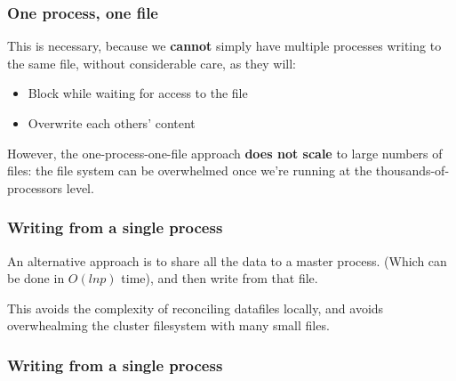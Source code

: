\begin{Shaded}
\begin{Highlighting}[]

     
\end{Highlighting}
\end{Shaded}

\begin{Shaded}
\begin{Highlighting}[]

     \NormalTok{)}
\end{Highlighting}
\end{Shaded}

\subsubsection{One process, one file}\label{one-process-one-file-1}

This is necessary, because we \textbf{cannot} simply have multiple
processes writing to the same file, without considerable care, as they
will:

\begin{itemize}
\itemsep1pt\parskip0pt
\item
  Block while waiting for access to the file
\item
  Overwrite each others' content
\end{itemize}

However, the one-process-one-file approach \textbf{does not scale} to
large numbers of files: the file system can be overwhelmed once we're
running at the thousands-of-processors level.

\subsubsection{Writing from a single
process}\label{writing-from-a-single-process-1}

An alternative approach is to share all the data to a master process.
(Which can be done in $O(ln p)$ time), and then write from that file.

This avoids the complexity of reconciling datafiles locally, and avoids
overwhealming the cluster filesystem with many small files.

\subsubsection{Writing from a single
process}\label{writing-from-a-single-process-2}

